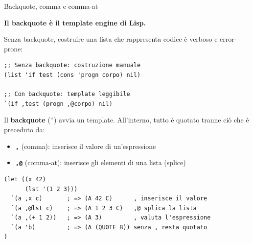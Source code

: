 \begin{concetto}{Backquote, comma e comma-at}
\end{concetto}

\begin{tcolorbox}[
  enhanced,
  colback=black!2, colframe=black!20,
  arc=3pt, boxrule=0.4pt,
  left=12pt, right=12pt, top=9pt, bottom=9pt,
  before skip=8pt, after skip=10pt
]
\small\color{black!65}

\textbf{Il backquote è il template engine di Lisp.}

\medskip
Senza backquote, costruire una lista che rappresenta codice
è verboso e error-prone:

\begin{tcolorbox}[enhanced, colback=clBg, colframe=gray!40,
  arc=2pt, boxrule=0.4pt, left=8pt, right=6pt, top=4pt, bottom=4pt,
  before skip=4pt, after skip=4pt]
\begin{lstlisting}
;; Senza backquote: costruzione manuale
(list 'if test (cons 'progn corpo) nil)

;; Con backquote: template leggibile
`(if ,test (progn ,@corpo) nil)
\end{lstlisting}
\end{tcolorbox}

\medskip
Il \textbf{backquote} (\texttt{`}) avvia un template.
All'interno, tutto è quotato tranne ciò che è preceduto da:
\begin{itemize}
  \item \textbf{\texttt{,}} (comma): inserisce il valore di
        un'espressione
  \item \textbf{\texttt{,@}} (comma-at): inserisce gli elementi
        di una lista (splice)
\end{itemize}

\begin{tcolorbox}[enhanced, colback=clBg, colframe=gray!40,
  arc=2pt, boxrule=0.4pt, left=8pt, right=6pt, top=4pt, bottom=4pt,
  before skip=4pt, after skip=4pt]
\begin{lstlisting}
(let ((x 42)
      (lst '(1 2 3)))
  `(a ,x c)       ; => (A 42 C)      , inserisce il valore
  `(a ,@lst c)    ; => (A 1 2 3 C)   ,@ splica la lista
  `(a ,(+ 1 2))   ; => (A 3)         , valuta l'espressione
  `(a 'b)         ; => (A (QUOTE B)) senza , resta quotato
)
\end{lstlisting}
\end{tcolorbox}


\end{tcolorbox}
